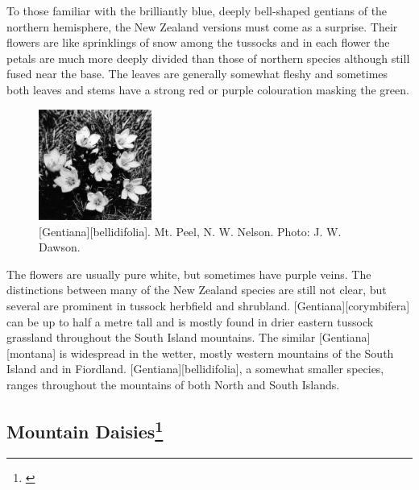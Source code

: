 To those familiar with the brilliantly blue, deeply bell-shaped gentians of the northern hemisphere, the New Zealand versions must come as a surprise.
Their flowers are like sprinklings of snow among the tussocks and in each flower the petals are much more deeply divided than those of northern species although still fused near the base.
The leaves are generally somewhat fleshy and sometimes both leaves and stems have a strong red or purple colouration masking the green.
\begin{figure}
	\includegraphics[width=0.33\textwidth]{graphics/figure101gentiana.jpg}
	\centering
	\caption[\emph{Gentiana bellidifolia}]{[Gentiana][bellidifolia].
	Mt. Peel,  N. W. Nelson.
	Photo: J. W. Dawson.}%
	\label{fig:101gentiana}
\end{figure}
The flowers are usually pure white, but sometimes have purple veins.
The distinctions between many of the New Zealand species are still not clear, but several are prominent in tussock herbfield and shrubland. [Gentiana][corymbifera] can be up to half a metre tall and is mostly found in drier eastern tussock grassland throughout the South Island mountains.
The similar [Gentiana][montana] is widespread in the wetter, mostly western mountains of the South Island and in Fiordland. [Gentiana][bellidifolia], a somewhat smaller species, ranges throughout the mountains of both North and South Islands.

\subsection[Mountain Daisies]{Mountain Daisies\thinspace\footnote{\cite{given1969synopsis}}}

